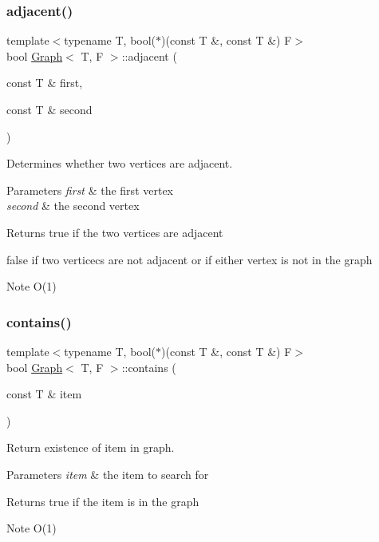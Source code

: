 \subsubsection{\texorpdfstring{adjacent()}{adjacent()}}
{\footnotesize\ttfamily template$<$typename T, bool($\ast$)(const T \&, const T \&) F$>$ \\
bool \hyperlink{class_graph}{Graph}$<$ T, F $>$\+::adjacent (\begin{DoxyParamCaption}\item[{const T \&}]{first,  }\item[{const T \&}]{second }\end{DoxyParamCaption})}



Determines whether two vertices are adjacent. 


\begin{DoxyParams}{Parameters}
{\em first} & the first vertex \\
\hline
{\em second} & the second vertex \\
\hline
\end{DoxyParams}
\begin{DoxyReturn}{Returns}
true if the two vertices are adjacent 

false if two verticecs are not adjacent or if either vertex is not in the graph
\end{DoxyReturn}
\begin{DoxyNote}{Note}
O(1) 
\end{DoxyNote}
\mbox{\label{class_graph_a9e88e1fec0b85da66ea58a39a4fdc652}} 
\subsubsection{\texorpdfstring{contains()}{contains()}}
{\footnotesize\ttfamily template$<$typename T, bool($\ast$)(const T \&, const T \&) F$>$ \\
bool \hyperlink{class_graph}{Graph}$<$ T, F $>$\+::contains (\begin{DoxyParamCaption}\item[{const T \&}]{item }\end{DoxyParamCaption})}



Return existence of item in graph. 


\begin{DoxyParams}{Parameters}
{\em item} & the item to search for \\
\hline
\end{DoxyParams}
\begin{DoxyReturn}{Returns}
true if the item is in the graph
\end{DoxyReturn}
\begin{DoxyNote}{Note}
O(1) 
\end{DoxyNote}
\mbox{\label{class_graph_aaab69d9804f13918c7fe260b86a40d91}} 

